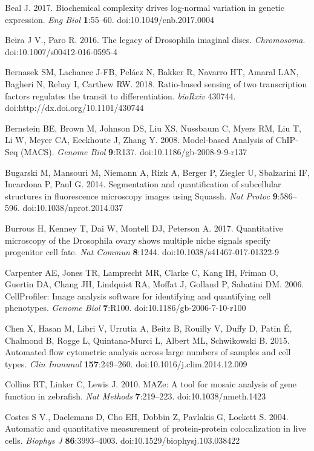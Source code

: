Beal J. 2017. Biochemical complexity drives log-normal variation in genetic expression. \emph{Eng Biol} \textbf{1}:55--60. doi:10.1049/enb.2017.0004

Beira J V., Paro R. 2016. The legacy of Drosophila imaginal discs. \emph{Chromosoma}. doi:10.1007/s00412-016-0595-4

Bernasek SM, Lachance J-FB, Peláez N, Bakker R, Navarro HT, Amaral LAN, Bagheri N, Rebay I, Carthew RW. 2018. Ratio-based sensing of two transcription factors regulates the transit to differentiation. \emph{bioRxiv} 430744. doi:http://dx.doi.org/10.1101/430744

Bernstein BE, Brown M, Johnson DS, Liu XS, Nussbaum C, Myers RM, Liu T, Li W, Meyer CA, Eeckhoute J, Zhang Y. 2008. Model-based Analysis of ChIP-Seq (MACS). \emph{Genome Biol} \textbf{9}:R137. doi:10.1186/gb-2008-9-9-r137

Bugarski M, Mansouri M, Niemann A, Rizk A, Berger P, Ziegler U, Sbalzarini IF, Incardona P, Paul G. 2014. Segmentation and quantification of subcellular structures in fluorescence microscopy images using Squassh. \emph{Nat Protoc} \textbf{9}:586--596. doi:10.1038/nprot.2014.037

Burrous H, Kenney T, Dai W, Montell DJ, Peterson A. 2017. Quantitative microscopy of the Drosophila ovary shows multiple niche signals specify progenitor cell fate. \emph{Nat Commun} \textbf{8}:1244. doi:10.1038/s41467-017-01322-9

Carpenter AE, Jones TR, Lamprecht MR, Clarke C, Kang IH, Friman O, Guertin DA, Chang JH, Lindquist RA, Moffat J, Golland P, Sabatini DM. 2006. CellProfiler: Image analysis software for identifying and quantifying cell phenotypes. \emph{Genome Biol} \textbf{7}:R100. doi:10.1186/gb-2006-7-10-r100

Chen X, Hasan M, Libri V, Urrutia A, Beitz B, Rouilly V, Duffy D, Patin É, Chalmond B, Rogge L, Quintana-Murci L, Albert ML, Schwikowski B. 2015. Automated flow cytometric analysis across large numbers of samples and cell types. \emph{Clin Immunol} \textbf{157}:249--260. doi:10.1016/j.clim.2014.12.009

Collins RT, Linker C, Lewis J. 2010. MAZe: A tool for mosaic analysis of gene function in zebrafish. \emph{Nat Methods} \textbf{7}:219--223. doi:10.1038/nmeth.1423

Costes S V., Daelemans D, Cho EH, Dobbin Z, Pavlakis G, Lockett S. 2004. Automatic and quantitative measurement of protein-protein colocalization in live cells. \emph{Biophys J} \textbf{86}:3993--4003. doi:10.1529/biophysj.103.038422

